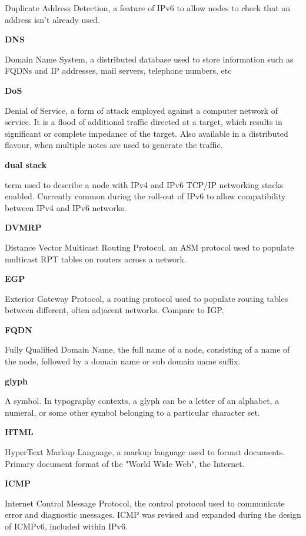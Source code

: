 Duplicate Address Detection, a feature of IPv6 to allow nodes to check
that an address isn't already used.

\textbf{DNS}

Domain Name System, a distributed database used to store information
such as FQDNs and IP addresses, mail servers, telephone numbers, etc

\textbf{DoS}

Denial of Service, a form of attack employed against a computer network
of service. It is a flood of additional traffic directed at a target,
which results in significant or complete impedance of the target. Also
available in a distributed flavour, when multiple notes are used to
generate the traffic.

\textbf{dual stack}

term used to describe a node with IPv4 and IPv6 TCP/IP networking stacks
enabled. Currently common during the roll-out of IPv6 to allow
compatibility between IPv4 and IPv6 networks.

\textbf{DVMRP}

Distance Vector Multicast Routing Protocol, an ASM protocol used to
populate multicast RPT tables on routers across a network.

\textbf{EGP}

Exterior Gateway Protocol, a routing protocol used to populate routing
tables between different, often adjacent networks. Compare to IGP.

\textbf{FQDN}

Fully Qualified Domain Name, the full name of a node, consisting of a
name of the node, followed by a domain name or sub domain name suffix.

\textbf{glyph}

A symbol. In typography contexts, a glyph can be a letter of an
alphabet, a numeral, or some other symbol belonging to a particular
character set.

\textbf{HTML}

HyperText Markup Language, a markup language used to format documents.
Primary document format of the "World Wide Web", the Internet.

\textbf{ICMP}

Internet Control Message Protocol, the control protocol used to
communicate error and diagnostic messages. ICMP was revised and expanded 
during the design of ICMPv6, included within IPv6.

